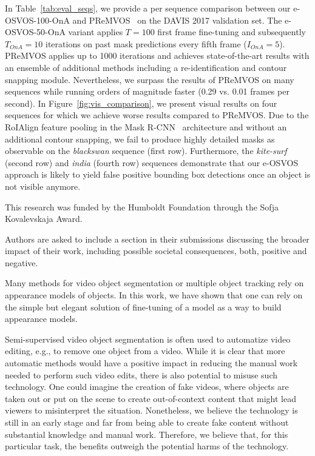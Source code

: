 \documentclass{article}
\begin{document}
    In Table~\ref{tab:eval_seqs}, we provide a per sequence comparison between our e-OSVOS-100-OnA and PReMVOS~\cite{luiten2018premvos} on the DAVIS 2017 validation set.
The e-OSVOS-50-OnA variant applies $T=100$ first frame fine-tuning and subsequently $T_{OnA}=10$ iterations on past mask predictions every fifth frame ($I_{OnA}=5$).
PReMVOS applies up to 1000 iterations and achieves state-of-the-art results with an ensemble of additional methods including a re-identification and contour snapping module.
Nevertheless, we surpass the results of PReMVOS on many sequences while running orders of magnitude faster (0.29 vs. 0.01 frames per second).
In Figure~\ref{fig:vis_comparison}, we present visual results on four sequences for which we achieve worse results compared to PReMVOS.
Due to the RoIAlign feature pooling in the Mask R-CNN~\cite{MaskRCNN} architecture and without an additional contour snapping, we fail to produce highly detailed masks as observable on the \textit{blackswan} sequence (first row).
Furthermore, the \textit{kite-surf} (second row) and \textit{india} (fourth row) sequences demonstrate that our e-OSVOS approach is likely to yield false positive bounding box detections once an object is not visible anymore.
 \fi

\clearpage
{}

This research was funded by the Humboldt Foundation through the Sofja Kovalevskaja Award. 


Authors are asked to include a section in their submissions discussing the broader impact of their work, including possible societal consequences, both, positive and negative.


Many methods for video object segmentation or multiple object tracking rely on appearance models of objects.
In this work, we have shown that one can rely on the simple but elegant solution of fine-tuning of a model as a way to build appearance models.


Semi-supervised video object segmentation is often used to automatize video editing, e.g., to remove one object from a video.
While it is clear that more automatic methods would have a positive impact in reducing the manual work needed to perform such video edits, there is also potential to misuse such technology. One could imagine the creation of fake videos, where objects are taken out or put on the scene to create out-of-context content that might lead viewers to misinterpret the situation.
Nonetheless, we believe the technology is still in an early stage and far from being able to create fake content without substantial knowledge and manual work.
Therefore, we believe that, for this particular task, the benefits outweigh the potential harms of the technology.
\end{document}
